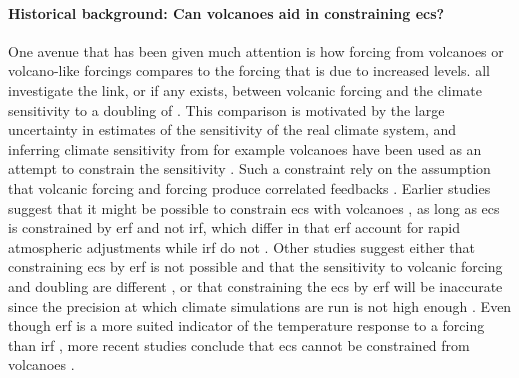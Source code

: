 \documentclass{ametsocV5}
\begin{document}

\paragraph*{Historical background: Can volcanoes aid  in constraining \ac{ecs}?}


One avenue that has been given much attention is how forcing from volcanoes or
volcano-like forcings compares to the forcing that is due to increased  levels.
\citet{boer2007,marvel2016,merlis2014,ollila2016,richardson2019,salvi2022,wigley2005}
all investigate the link, or if any exists, between volcanic forcing and the climate
sensitivity to a doubling of . This comparison is motivated by the large
uncertainty in estimates of the sensitivity of the real climate system, and inferring
climate sensitivity from for example volcanoes have been used as an attempt to constrain
the sensitivity \citep{boer2007}. Such a constraint rely on the assumption that volcanic
forcing and  forcing produce correlated feedbacks \citep{pauling2023}.
Earlier studies suggest that it might be possible to constrain \ac{ecs} with volcanoes
\citep{bender2010}, as long as \ac{ecs} is constrained by \ac{erf} and not \ac{irf},
which differ in that \ac{erf} account for rapid atmospheric adjustments while \ac{irf}
do not \citep{richardson2019}. Other studies suggest either that constraining \ac{ecs}
by \ac{erf} is not possible and that the sensitivity to volcanic forcing and 
doubling are different \citep{douglass2006}, or that constraining the \ac{ecs} by
\ac{erf} will be inaccurate since the precision at which climate simulations are run is
not high enough \citep{boer2007,salvi2022}. Even though \ac{erf} is a more suited
indicator of the temperature response to a forcing than \ac{irf}
\citep{marvel2016,richardson2019}, more recent studies conclude that \ac{ecs} cannot be
constrained from volcanoes \citep{pauling2023}.
\end{document}

